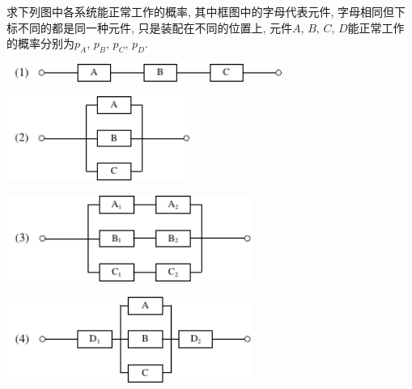 \documentclass[standard]{ExBook}
\begin{document}
\begin{qitems}
\vspace{-5em}

    \begin{bbox}
    \begin{shaded}
        \qitem
求下列图中各系统能正常工作的概率, 其中框图中的字母代表元件, 字母相同但下标不同的都是同一种元件, 只是装配在不同的位置上, 元件$A$, $B$, $C$, $D$能正常工作的概率分别为$p_A$, $p_B$, $p_C$, $p_D$.

\begin{minipage}{9cm}
    \centering
    \includegraphics[width=9cm]{img/1.39_1.pdf}
\end{minipage}

\vspace{1em}

\begin{minipage}{6cm}
    \centering
    \includegraphics[width=6cm]{img/1.39_2.pdf}
\end{minipage}

\vspace{1em}

\begin{minipage}{8cm}
    \centering
    \includegraphics[width=8cm]{img/1.39_3.pdf}
\end{minipage}

\vspace{1em}

\begin{minipage}{8cm}
    \centering
    \includegraphics[width=8cm]{img/1.39_4.pdf}
\end{minipage}


\end{shaded}
\end{bbox}
\end{qitems}
\end{document}
